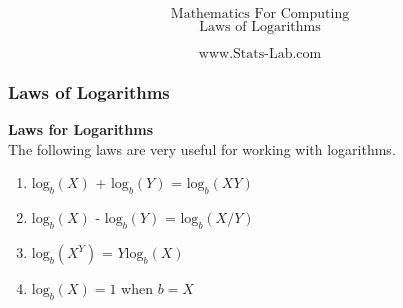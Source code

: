 \documentclass{beamer}
\begin{document}
\begin{frame}
\huge
\[\mbox{Mathematics For Computing}\]
\[\mbox{Laws of Logarithms}   \]

\LARGE
\[\mbox{www.Stats-Lab.com}   \]
\end{frame}

\begin{frame}
\frametitle{Laws of Logarithms}
\Large
\vspace{-1cm}
\textbf{Laws for Logarithms}\\
The following laws are very useful for working with logarithms.\bigskip
\begin{enumerate}
\item $\mbox{log}_b(X)$ + $\mbox{log}_b(Y)$ = $\mbox{log}_b(XY)$\bigskip
\item $\mbox{log}_b(X)$ - $\mbox{log}_b(Y)$ = $\mbox{log}_b(X / Y)$ \bigskip
\item $\mbox{log}_b(X^Y)$ = $Y \mbox{log}_b(X)$
\bigskip
\item $\mbox{log}_b(X) = 1 $ when $b=X$
\end{enumerate}
\end{frame}
\end{document}
